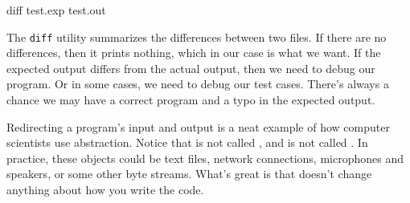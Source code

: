 \begin{stdout}
diff test.exp test.out
\end{stdout}

The {\tt diff} utility summarizes the differences between two files.
If there are no differences, then it prints nothing, which in our case is what we want.
If the expected output differs from the actual output, then we need to debug our program.
Or in some cases, we need to debug our test cases.
There's always a chance we may have a correct program and a typo in the expected output.

Redirecting a program's input and output is a neat example of how computer scientists use abstraction.
Notice that  is not called , and  is not called .
In practice, these objects could be text files, network connections, microphones and speakers, or some other byte streams.
What's great is that doesn't change anything about how you write the code.
